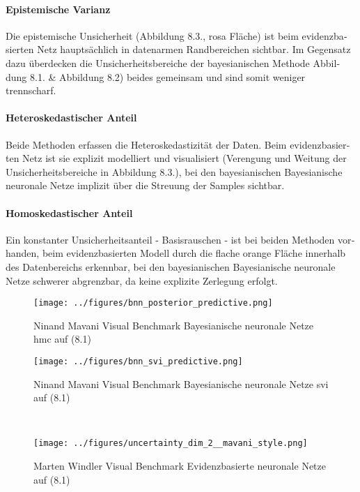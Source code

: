 \begin{otherlanguage}{ngerman}
\paragraph{Epistemische Varianz} Die epistemische Unsicherheit (Abbildung 8.3., rosa Fläche) ist beim evidenzbasierten Netz hauptsächlich in datenarmen Randbereichen sichtbar. Im Gegensatz dazu überdecken die Unsicherheitsbereiche der bayesianischen Methode Abbildung 8.1. & Abbildung 8.2) beides gemeinsam und sind somit weniger trennscharf.

\paragraph{Heteroskedastischer Anteil} Beide Methoden erfassen die Heteroskedastizität der Daten. Beim evidenzbasierten Netz ist sie explizit modelliert und visualisiert (Verengung und Weitung der Unsicherheitsbereiche in Abbildung 8.3.), bei den \gls{bayesianischen Bayesianische neuronale Netze} implizit über die Streuung der Samples sichtbar.

\paragraph{Homoskedastischer Anteil} Ein konstanter Unsicherheitsanteil - Basisrauschen - ist bei beiden Methoden vorhanden, beim evidenzbasierten Modell durch die flache orange Fläche innerhalb des Datenbereichs erkennbar, bei den \gls{bayesianischen Bayesianische neuronale Netze} schwerer abgrenzbar, da keine explizite Zerlegung erfolgt.


\begin{figure}[!h]
  \centering
  \begin{minipage}{0.5\textwidth}
      \centering
      \texttt{[image: ../figures/bnn\_posterior\_predictive.png]}
      \caption{Ninand Mavani Visual Benchmark \gls{Bayesianische neuronale Netze} \gls{hmc} auf (8.1)}
  \end{minipage}%
  \begin{minipage}{0.5\textwidth}
      \centering
      \texttt{[image: ../figures/bnn\_svi\_predictive.png]}
      \caption{Ninand Mavani Visual Benchmark \gls{Bayesianische neuronale Netze} \gls{svi} auf (8.1)}
  \end{minipage}
  \\[1em]
  \begin{minipage}{0.5\textwidth}
      \centering
      \texttt{[image: ../figures/uncertainty\_dim\_2\_\_mavani\_style.png]}
      \caption{Marten Windler Visual Benchmark \gls{Evidenzbasierte neuronale Netze} auf (8.1)}
  \end{minipage}
\end{figure}




\end{otherlanguage}
